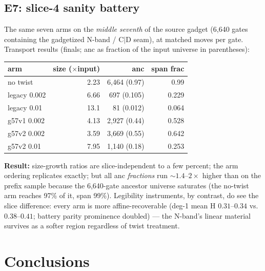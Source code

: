 \documentclass[11pt]{article}
\begin{document}
\subsection{E7: slice-4 sanity battery}
The same seven arms on the \emph{middle seventh} of the source gadget
(6{,}640 gates containing the gadgetized N-band / C$|$D seam), at matched
moves per gate. Transport results (finals; anc as fraction of the input
universe in parentheses):

\begin{center}\small
\begin{tabular}{lrrr}
\toprule
arm & size ($\times$input) & anc & span frac \\
\midrule
no twist    & 2.23 & 6{,}464 (0.97) & 0.99 \\
legacy 0.002& 6.66 & 697 (0.105)    & 0.229 \\
legacy 0.01 & 13.1 & 81 (0.012)     & 0.064 \\
g57v1 0.002 & 4.13 & 2{,}927 (0.44) & 0.528 \\
g57v2 0.002 & 3.59 & 3{,}669 (0.55) & 0.642 \\
g57v2 0.01  & 7.95 & 1{,}140 (0.18) & 0.253 \\
\bottomrule
\end{tabular}
\end{center}

\textbf{Result:} size-growth ratios are slice-independent to a few percent;
the arm ordering replicates exactly; but all anc \emph{fractions} run
${\sim}1.4$--$2\times$ higher than on the prefix sample because the
6{,}640-gate ancestor universe saturates (the no-twist arm reaches 97\% of
it, span 99\%). Legibility instruments, by contrast, do see the slice
difference: every arm is more affine-recoverable (deg-1 mean H
$0.31$--$0.34$ vs.\ $0.38$--$0.41$; battery parity prominence doubled) ---
the N-band's linear material survives as a softer region regardless of
twist treatment.

\section{Conclusions}
\end{document}
